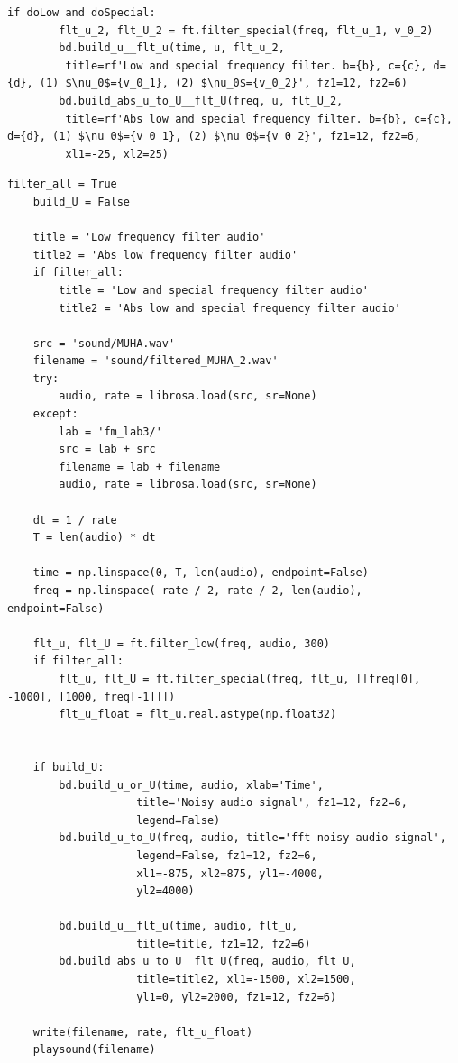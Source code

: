 \documentclass[a4paper, 12pt]{article}
\begin{document}
\begin{lstlisting}[label=l7, caption={Файл nospec.py. Фильтрация специфических частот.}]
    if doLow and doSpecial:
        flt_u_2, flt_U_2 = ft.filter_special(freq, flt_u_1, v_0_2)
        bd.build_u__flt_u(time, u, flt_u_2,
         title=rf'Low and special frequency filter. b={b}, c={c}, d={d}, (1) $\nu_0$={v_0_1}, (2) $\nu_0$={v_0_2}', fz1=12, fz2=6)
        bd.build_abs_u_to_U__flt_U(freq, u, flt_U_2,
         title=rf'Abs low and special frequency filter. b={b}, c={c}, d={d}, (1) $\nu_0$={v_0_1}, (2) $\nu_0$={v_0_2}', fz1=12, fz2=6,
         xl1=-25, xl2=25)
    \end{lstlisting}
    \begin{lstlisting}[label=l8, caption={Файл audio.py. Фильтрация шумов в аудиозаписи.}]
    filter_all = True
    build_U = False
        
    title = 'Low frequency filter audio'
    title2 = 'Abs low frequency filter audio'
    if filter_all:
        title = 'Low and special frequency filter audio'
        title2 = 'Abs low and special frequency filter audio'
        
    src = 'sound/MUHA.wav'
    filename = 'sound/filtered_MUHA_2.wav'
    try:
        audio, rate = librosa.load(src, sr=None)
    except:
        lab = 'fm_lab3/'
        src = lab + src
        filename = lab + filename
        audio, rate = librosa.load(src, sr=None)
        
    dt = 1 / rate
    T = len(audio) * dt
        
    time = np.linspace(0, T, len(audio), endpoint=False)
    freq = np.linspace(-rate / 2, rate / 2, len(audio), endpoint=False)
        
    flt_u, flt_U = ft.filter_low(freq, audio, 300)
    if filter_all:
        flt_u, flt_U = ft.filter_special(freq, flt_u, [[freq[0], -1000], [1000, freq[-1]]])
        flt_u_float = flt_u.real.astype(np.float32)
        
        
    if build_U:
        bd.build_u_or_U(time, audio, xlab='Time',
                    title='Noisy audio signal', fz1=12, fz2=6,
                    legend=False)
        bd.build_u_to_U(freq, audio, title='fft noisy audio signal',
                    legend=False, fz1=12, fz2=6,
                    xl1=-875, xl2=875, yl1=-4000,
                    yl2=4000)
        
        bd.build_u__flt_u(time, audio, flt_u,
                    title=title, fz1=12, fz2=6)
        bd.build_abs_u_to_U__flt_U(freq, audio, flt_U,
                    title=title2, xl1=-1500, xl2=1500,
                    yl1=0, yl2=2000, fz1=12, fz2=6)
        
    write(filename, rate, flt_u_float)
    playsound(filename)
    \end{lstlisting}
\end{document}
